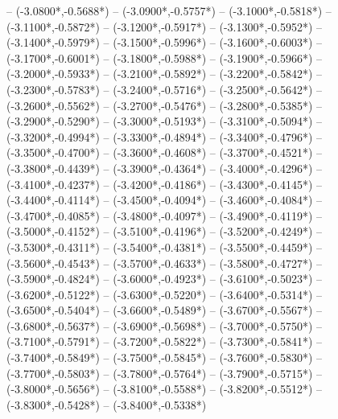 {	-- ({-3.0800*\dx},{-0.5688*\dy})
	-- ({-3.0900*\dx},{-0.5757*\dy})
	-- ({-3.1000*\dx},{-0.5818*\dy})
	-- ({-3.1100*\dx},{-0.5872*\dy})
	-- ({-3.1200*\dx},{-0.5917*\dy})
	-- ({-3.1300*\dx},{-0.5952*\dy})
	-- ({-3.1400*\dx},{-0.5979*\dy})
	-- ({-3.1500*\dx},{-0.5996*\dy})
	-- ({-3.1600*\dx},{-0.6003*\dy})
	-- ({-3.1700*\dx},{-0.6001*\dy})
	-- ({-3.1800*\dx},{-0.5988*\dy})
	-- ({-3.1900*\dx},{-0.5966*\dy})
	-- ({-3.2000*\dx},{-0.5933*\dy})
	-- ({-3.2100*\dx},{-0.5892*\dy})
	-- ({-3.2200*\dx},{-0.5842*\dy})
	-- ({-3.2300*\dx},{-0.5783*\dy})
	-- ({-3.2400*\dx},{-0.5716*\dy})
	-- ({-3.2500*\dx},{-0.5642*\dy})
	-- ({-3.2600*\dx},{-0.5562*\dy})
	-- ({-3.2700*\dx},{-0.5476*\dy})
	-- ({-3.2800*\dx},{-0.5385*\dy})
	-- ({-3.2900*\dx},{-0.5290*\dy})
	-- ({-3.3000*\dx},{-0.5193*\dy})
	-- ({-3.3100*\dx},{-0.5094*\dy})
	-- ({-3.3200*\dx},{-0.4994*\dy})
	-- ({-3.3300*\dx},{-0.4894*\dy})
	-- ({-3.3400*\dx},{-0.4796*\dy})
	-- ({-3.3500*\dx},{-0.4700*\dy})
	-- ({-3.3600*\dx},{-0.4608*\dy})
	-- ({-3.3700*\dx},{-0.4521*\dy})
	-- ({-3.3800*\dx},{-0.4439*\dy})
	-- ({-3.3900*\dx},{-0.4364*\dy})
	-- ({-3.4000*\dx},{-0.4296*\dy})
	-- ({-3.4100*\dx},{-0.4237*\dy})
	-- ({-3.4200*\dx},{-0.4186*\dy})
	-- ({-3.4300*\dx},{-0.4145*\dy})
	-- ({-3.4400*\dx},{-0.4114*\dy})
	-- ({-3.4500*\dx},{-0.4094*\dy})
	-- ({-3.4600*\dx},{-0.4084*\dy})
	-- ({-3.4700*\dx},{-0.4085*\dy})
	-- ({-3.4800*\dx},{-0.4097*\dy})
	-- ({-3.4900*\dx},{-0.4119*\dy})
	-- ({-3.5000*\dx},{-0.4152*\dy})
	-- ({-3.5100*\dx},{-0.4196*\dy})
	-- ({-3.5200*\dx},{-0.4249*\dy})
	-- ({-3.5300*\dx},{-0.4311*\dy})
	-- ({-3.5400*\dx},{-0.4381*\dy})
	-- ({-3.5500*\dx},{-0.4459*\dy})
	-- ({-3.5600*\dx},{-0.4543*\dy})
	-- ({-3.5700*\dx},{-0.4633*\dy})
	-- ({-3.5800*\dx},{-0.4727*\dy})
	-- ({-3.5900*\dx},{-0.4824*\dy})
	-- ({-3.6000*\dx},{-0.4923*\dy})
	-- ({-3.6100*\dx},{-0.5023*\dy})
	-- ({-3.6200*\dx},{-0.5122*\dy})
	-- ({-3.6300*\dx},{-0.5220*\dy})
	-- ({-3.6400*\dx},{-0.5314*\dy})
	-- ({-3.6500*\dx},{-0.5404*\dy})
	-- ({-3.6600*\dx},{-0.5489*\dy})
	-- ({-3.6700*\dx},{-0.5567*\dy})
	-- ({-3.6800*\dx},{-0.5637*\dy})
	-- ({-3.6900*\dx},{-0.5698*\dy})
	-- ({-3.7000*\dx},{-0.5750*\dy})
	-- ({-3.7100*\dx},{-0.5791*\dy})
	-- ({-3.7200*\dx},{-0.5822*\dy})
	-- ({-3.7300*\dx},{-0.5841*\dy})
	-- ({-3.7400*\dx},{-0.5849*\dy})
	-- ({-3.7500*\dx},{-0.5845*\dy})
	-- ({-3.7600*\dx},{-0.5830*\dy})
	-- ({-3.7700*\dx},{-0.5803*\dy})
	-- ({-3.7800*\dx},{-0.5764*\dy})
	-- ({-3.7900*\dx},{-0.5715*\dy})
	-- ({-3.8000*\dx},{-0.5656*\dy})
	-- ({-3.8100*\dx},{-0.5588*\dy})
	-- ({-3.8200*\dx},{-0.5512*\dy})
	-- ({-3.8300*\dx},{-0.5428*\dy})
	-- ({-3.8400*\dx},{-0.5338*\dy})
}

